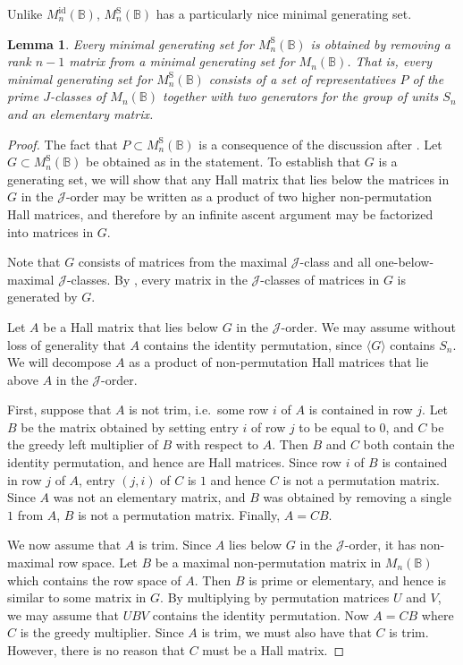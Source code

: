 \documentclass[11pt]{article}
\newtheorem{lemma}[thm]{Lemma}
\numberwithin{equation}{section}
\newcommand{\B}{\mathbb{B}}
\newcommand{\Bn}{M_n(\B)}
\newcommand{\Refn}{M_n^{\text{id}}(\B)}
\newcommand{\Halln}{M_n^{\text{S}}(\B)}
\newcommand{\J}{\mathscr{J}}
\begin{document}
Unlike $\Refn$, $\Halln$ has a particularly nice minimal generating set.
\begin{lemma}
  Every minimal generating set for $\Halln$ is obtained by removing a rank $n-1$
  matrix from a minimal generating set for $\Bn$. That is, every minimal
  generating set for $\Halln$ consists of a set of representatives $P$ of the
  prime $J$-classes of $\Bn$ together with two generators for the group of units
  $S_n$ and an elementary matrix.
\end{lemma}
\begin{proof}
  The fact that $P \subset \Halln$ is a consequence of the discussion after
  \cite[Definition 2.4]{Caen1981aa}. Let $G \subset \Halln$ be obtained as in
  the statement. To establish that $G$ is a generating set, we will show that
  any Hall matrix that lies below the matrices in $G$ in the $\J$-order may be
  written as a product of two higher non-permutation Hall matrices, and
  therefore by an infinite ascent argument may be factorized into matrices in
  $G$.
  
  Note that $G$ consists of matrices from the maximal $\J$-class and all
  one-below-maximal $\J$-classes. By , every
  matrix in the $\J$-classes of matrices in $G$ is generated by $G$.

  Let $A$ be a Hall matrix that lies below $G$ in the $\J$-order. We may assume
  without loss of generality that $A$ contains the identity permutation, since
  $\langle G \rangle$ contains $S_n$. We will decompose $A$ as a product of
  non-permutation Hall matrices that lie above $A$ in the $\J$-order. 

  First, suppose that $A$ is not trim, i.e.\ some row $i$ of $A$ is contained in
  row $j$. Let $B$ be the matrix obtained by setting entry $i$ of row $j$ to be
  equal to $0$, and $C$ be the greedy left multiplier of $B$ with respect to
  $A$. Then $B$ and $C$ both contain the identity permutation, and hence are
  Hall matrices. Since row $i$ of $B$ is contained in row $j$ of $A$, entry $(j,
  i)$ of $C$ is $1$ and hence $C$ is not a permutation matrix.  Since $A$ was
  not an elementary matrix, and $B$ was obtained by removing a single $1$ from
  $A$, $B$ is not a permutation matrix. Finally, $A = CB$.

  We now assume that $A$ is trim. Since $A$ lies below $G$ in the $\J$-order, it
  has non-maximal row space. Let $B$ be a maximal non-permutation matrix in
  $\Bn$ which contains the row space of $A$. Then $B$ is prime or elementary,
  and hence is similar to some matrix in $G$. By multiplying by permutation
  matrices $U$ and $V$, we may assume that $UBV$ contains the identity
  permutation. Now $A = CB$ where $C$ is the greedy multiplier. Since $A$ is
  trim, we must also have that $C$ is trim. However, there is no reason that $C$
  must be a Hall matrix.
  

\end{proof}
\end{document}
